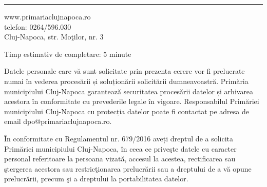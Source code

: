 \documentclass[11pt,a4paper]{article}
\begin{document}
\vfill
\hrule
\vspace{0.2cm}
www.primariaclujnapoca.ro\\
telefon: 0264/596.030\\
Cluj-Napoca, str. Moţilor, nr. 3

\vspace{0.3cm}

Timp estimativ de completare: 5 minute

Datele personale care vă sunt solicitate prin prezenta cerere vor fi prelucrate numai în vederea procesării și soluționării solicitării dumneavoastră. Primăria municipiului Cluj-Napoca garantează securitatea procesării datelor și arhivarea acestora în conformitate cu prevederile legale în vigoare. Responsabilul Primăriei municipiului Cluj-Napoca cu protecția datelor poate fi contactat pe adresa de email dpo@primariaclujnapoca.ro.

În conformitate cu Regulamentul nr. 679/2016 aveți dreptul de a solicita Primăriei municipiului Cluj-Napoca, în ceea ce priveşte datele cu caracter personal referitoare la persoana vizată, accesul la acestea, rectificarea sau ştergerea acestora sau restricţionarea prelucrării sau a dreptului de a vă opune prelucrării, precum şi a dreptului la portabilitatea datelor.
\end{document}
